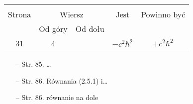 \documentclass[a4paper,11pt]{article}
\begin{document}
\begin{center}

  \begin{tabular}{|c|c|c|c|c|}
    \hline
    & \multicolumn{2}{c|}{} & & \\
    Strona & \multicolumn{2}{c|}{Wiersz} & Jest
                              & Powinno być \\ \cline{2-3}
    & Od góry & Od dołu & & \\
    \hline
    31 & 4 & & $-c^{ 2 } \hbar^{ 2 }$ & $+c^{ 2 } \hbar^{ 2 }$ \\
    \hline
  \end{tabular}

\end{center}


\begin{itemize}
\item[--] Str. 85. \ldots
\item[--] Str. 86. Równania (2.5.1) i\ldots
\item[--] Str. 86. równanie na dole
\end{itemize}
\end{document}
